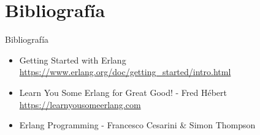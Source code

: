 \documentclass{beamer}
\begin{document}
  \section{Bibliografía}
    \begin{frame}{Bibliografía}
      \begin{itemize}
        \item Getting Started with Erlang \url{https://www.erlang.org/doc/getting_started/intro.html}
        \item Learn You Some Erlang for Great Good! - Fred Hébert \url{https://learnyousomeerlang.com}
        \item Erlang Programming - Francesco Cesarini \& Simon Thompson
      \end{itemize}
    \end{frame}
\end{document}
